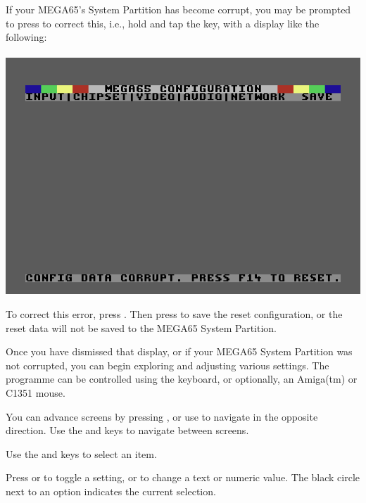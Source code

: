 \begin{minipage}{\linewidth}
  If your MEGA65's System Partition has become corrupt, you may be
  prompted to press  to correct this, i.e., hold  and tap
  the  key, with a display like the following: \\
  \\
  \includegraphics[width=\linewidth]{images/ss-m65config-corrupt.png}
\end{minipage}

To correct this error, press . Then press  to save the reset configuration, or the reset data will not be saved to the MEGA65 System
Partition.

Once you have dismissed that display, or if your MEGA65 System Partition was not corrupted, you can begin exploring and adjusting various settings. The programme can be controlled using the keyboard, or optionally, an Amiga(tm) or C1351 mouse.

You can advance screens by pressing , or use  to navigate in the opposite direction. Use the \megakey{$\leftarrow$} and \megakey{$\rightarrow$} keys to navigate between screens.

Use the \megakey{$\uparrow$} and \megakey{$\downarrow$} keys to select an item.

Press  or  to toggle a setting, or to change a text or numeric value. The black circle next to an option indicates the current selection.

